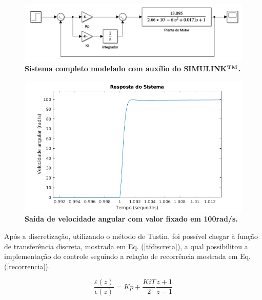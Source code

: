 \documentclass[10pt,fleqn,a4paper]{article}
\begin{document}
    \begin{figure}[ht]
    	\begin{center}
    		\includegraphics[angle=0, scale=0.4]{images/sistemaEControlador}
    	\end{center}
    	\caption{\textbf{Sistema completo modelado com auxílio do SIMULINK$^{\small{\textbf{TM}}}$.}}
    	\label{fig:sistemasimulink}
    \end{figure}

	\begin{figure}[ht]
		\begin{center}
			\includegraphics[angle=0, scale=0.6]{images/sistemStep}
		\end{center}
		\caption{\textbf{Saída de velocidade angular com valor fixado em 100rad/s.}}
		\label{fig:saidasimulada}
	\end{figure}
    
    Após a discretização, utilizando o método de Tustin, foi possível chegar à função de transferência discreta, mostrada em Eq. (\ref{tfdiscreta}), a qual possibilitou a implementação do controle seguindo a relação de recorrência mostrada em Eq. (\ref{recorrencia}).
    
    \begin{equation}
    \frac{\varepsilon(z)}{\epsilon(z)}= Kp + \frac{Ki T}{2}\frac{z+1}{z-1} \label{tfdiscreta}
    \end{equation}
    
\end{document}
